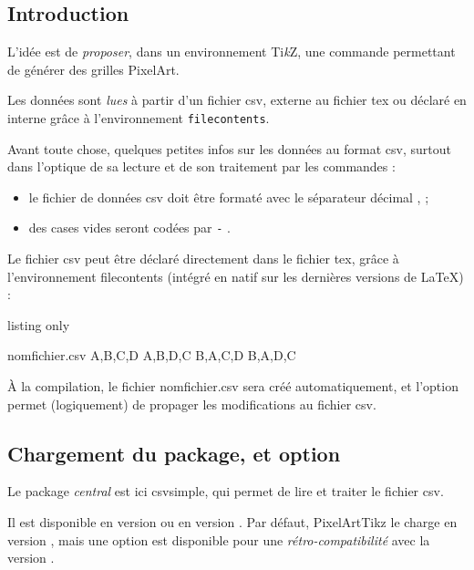 \documentclass{article}
\newcommand\Cle[1]{{\bfseries\sffamily\textlangle #1\textrangle}}
\begin{document}
\subsection{Introduction}

L'idée est de \textit{proposer}, dans un environnement Ti\textit{k}Z, une commande permettant de générer des grilles PixelArt.

Les données sont \textit{lues} à partir d'un fichier \textsf{csv}, externe au fichier \textsf{tex} ou déclaré en interne grâce à l'environnement \texttt{filecontents}.

\medskip

Avant toute chose, quelques petites infos sur les données au format \textsf{csv}, surtout dans l'optique de sa lecture et de son traitement par les commandes :

\begin{itemize}
	\item le fichier de données \textsf{csv} doit être formaté avec le séparateur décimal \og , \fg ;
	\item des cases vides seront codées par \og \texttt{-} \fg.
\end{itemize}

Le fichier \textsf{csv} peut être déclaré directement dans le fichier \textsf{tex}, grâce à l'environnement \textsf{filecontents} (intégré en natif sur les dernières versions de \LaTeX) :

\begin{PresentationCode}{listing only}
	\begin{filecontents*}{nomfichier.csv}
		A,B,C,D
		A,B,D,C
		B,A,C,D
		B,A,D,C
	\end{filecontents*}
\end{PresentationCode}

À la compilation, le fichier \textsf{nomfichier.csv} sera créé automatiquement, et l'option \Cle{[overwrite]} permet (logiquement) de propager les modifications au fichier \textsf{csv}.

\subsection{Chargement du package, et option}

Le package \textit{central} est ici \textsf{csvsimple}, qui permet de lire et traiter le fichier \textsf{csv}.

Il est \og disponible \fg{} en version  ou en version . Par défaut, \textsf{PixelArtTikz} le charge en version , mais une \textsf{option} est disponible pour une \textit{rétro-compatibilité} avec la version .
\end{document}
